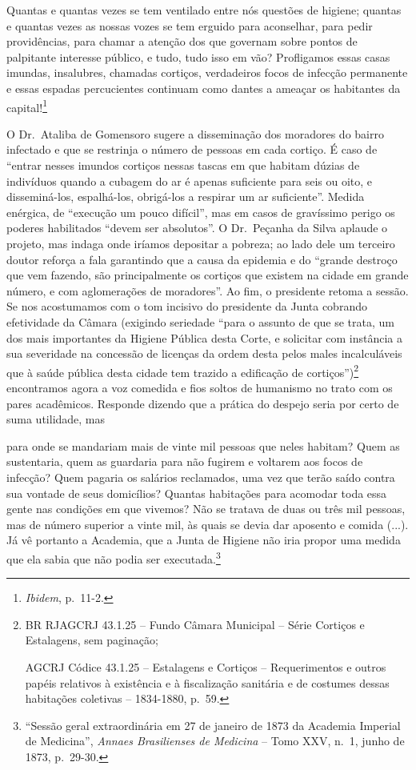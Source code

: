 Quantas e quantas vezes se tem ventilado entre nós questões de higiene;
quantas e quantas vezes as nossas vozes se tem erguido para aconselhar,
para pedir providências, para chamar a atenção dos que governam sobre
pontos de palpitante interesse público, e tudo, tudo isso em vão?
Profligamos essas casas imundas, insalubres, chamadas cortiços,
verdadeiros focos de infecção permanente e essas espadas percucientes
continuam como dantes a ameaçar os habitantes da capital!\footnote{\emph{Ibidem},
  p.~11-2.}

O Dr.~Ataliba de Gomensoro sugere a disseminação dos moradores do bairro
infectado e que se restrinja o número de pessoas em cada cortiço. É caso
de ``entrar nesses imundos cortiços nessas tascas em que habitam dúzias
de indivíduos quando a cubagem do ar é apenas suficiente para seis ou
oito, e disseminá-los, espalhá-los, obrigá-los a respirar um ar
suficiente''. Medida enérgica, de ``execução um pouco difícil'', mas em
casos de gravíssimo perigo os poderes habilitados ``devem ser
absolutos''. O Dr.~Peçanha da Silva aplaude o projeto, mas indaga onde
iríamos depositar a pobreza; ao lado dele um terceiro doutor reforça a
fala garantindo que a causa da epidemia e do ``grande destroço que vem
fazendo, são principalmente os cortiços que existem na cidade em grande
número, e com aglomerações de moradores''. Ao fim, o presidente retoma a
sessão. Se nos acostumamos com o tom incisivo do presidente da Junta
cobrando efetividade da Câmara (exigindo seriedade ``para o assunto de
que se trata, um dos mais importantes da Higiene Pública desta Corte, e
solicitar com instância a sua severidade na concessão de licenças da
ordem desta pelos males incalculáveis que à saúde pública desta cidade
tem trazido a edificação de cortiços'')\footnote{BR RJAGCRJ 43.1.25 --
  Fundo Câmara Municipal -- Série Cortiços e Estalagens, sem paginação;

  AGCRJ Códice 43.1.25 -- Estalagens e Cortiços -- Requerimentos e
  outros papéis relativos à existência e à fiscalização sanitária e de
  costumes dessas habitações coletivas -- 1834-1880, p.~59.} encontramos
agora a voz comedida e fios soltos de humanismo no trato com os pares
acadêmicos. Responde dizendo que a prática do despejo seria por certo de
suma utilidade, mas

para onde se mandariam mais de vinte mil pessoas que neles habitam? Quem
as sustentaria, quem as guardaria para não fugirem e voltarem aos focos
de infecção? Quem pagaria os salários reclamados, uma vez que terão
saído contra sua vontade de seus domicílios? Quantas habitações para
acomodar toda essa gente nas condições em que vivemos? Não se tratava de
duas ou três mil pessoas, mas de número superior a vinte mil, às quais
se devia dar aposento e comida (...). Já vê portanto a Academia, que a
Junta de Higiene não iria propor uma medida que ela sabia que não podia
ser executada.\footnote{``Sessão geral extraordinária em 27 de janeiro
  de 1873 da Academia Imperial de Medicina'', \emph{Annaes Brasilienses
  de Medicina} -- Tomo XXV, n.~1, junho de 1873, p.~29-30.}

